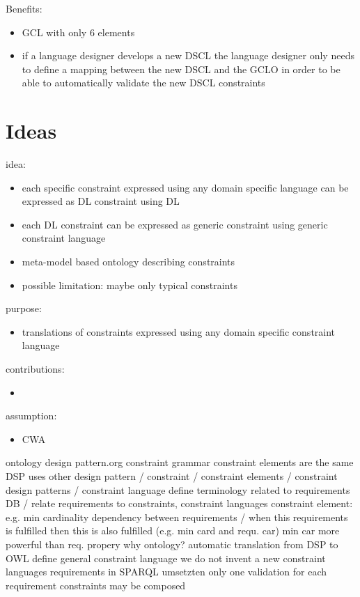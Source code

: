 \documentclass{llncs}
\begin{document}
Benefits:
\begin{itemize}
	\item GCL with only 6 elements
	\item if a language designer develops a new DSCL the language designer only needs to define a mapping between the new DSCL and the GCLO 
	in order to be able to automatically validate the new DSCL constraints
\end{itemize}

\section{Ideas}

idea:
\begin{itemize}
	\item each specific constraint expressed using any domain specific language can be expressed as DL constraint using DL
	\item each DL constraint can be expressed as generic constraint using generic constraint language
	\item meta-model based ontology describing constraints
	\item possible limitation: maybe only typical constraints
\end{itemize}

purpose:
\begin{itemize}
	\item translations of constraints expressed using any domain specific constraint language
\end{itemize}

contributions:
\begin{itemize}
	\item 
\end{itemize}

assumption:
\begin{itemize}
	\item CWA
\end{itemize}


ontology design pattern.org
constraint grammar
constraint elements are the same
DSP uses other design pattern / 
constraint / constraint elements / constraint design patterns / constraint language
define terminology
related to requirements DB / relate requirements to constraints, constraint languages
constraint element: e.g. min cardinality
dependency between requirements / when this requirements is fulfilled then this is also fulfilled (e.g. min card and requ. car)
min car more powerful than req. propery
why ontology? automatic translation from DSP to OWL 
define general constraint language
we do not invent a new constraint languages
requirements in SPARQL umsetzten
only one validation for each requirement
constraints may be composed 
\end{document}
